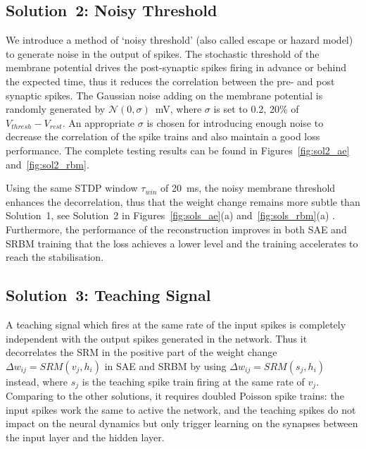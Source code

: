 \subsection{Solution~2: Noisy Threshold}
We introduce a method of `noisy threshold' (also called escape or hazard model)~\cite{gerstner2002spiking} to generate noise in the output of spikes.
The stochastic threshold of the membrane potential drives the post-synaptic spikes firing in advance or behind the expected time, thus it reduces the correlation between the pre- and post synaptic spikes.
The Gaussian noise adding on the membrane potential is randomly generated by $\mathcal{N}(0, \sigma)$~mV, where $\sigma$ is set to 0.2, 20\% of $V_{thresh} - V_{rest}.$
An appropriate $\sigma$ is chosen for introducing enough noise to decrease the correlation of the spike trains and also maintain a good loss performance.
The complete testing results can be found in Figures~\ref{fig:sol2_ae} and~\ref{fig:sol2_rbm}.

Using the same STDP window $\tau_{win}$ of 20~ms, the noisy membrane threshold enhances the decorrelation, thus that the weight change remains more subtle than Solution~1, see Solution~2 in Figures~\ref{fig:sols_ae}(a) and~\ref{fig:sols_rbm}(a) .
Furthermore, the performance of the reconstruction improves in both SAE and SRBM training that the loss achieves a lower level and the training accelerates to reach the stabilisation. %


\subsection{Solution~3: Teaching Signal}
A teaching signal which fires at the same rate of the input spikes is completely independent with the output spikes generated in the network.
Thus it decorrelates the SRM in the positive part of the weight change $\Delta w_{ij} = SRM(v_j,h_i)$ in SAE and SRBM by using $\Delta w_{ij}=SRM(s_j,h_i)$ instead, where $s_j$ is the teaching spike train firing at the same rate of $v_j$.
Comparing to the other solutions, it requires doubled Poisson spike trains: the input spikes work the same to active the network, and the teaching spikes do not impact on the neural dynamics but only trigger learning on the synapses between the input layer and the hidden layer.

